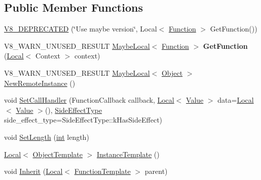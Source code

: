 \subsection*{Public Member Functions}
\begin{DoxyCompactItemize}
\item 
\mbox{\hyperlink{classv8_1_1FunctionTemplate_abd995d08f790cadf070d0fbd2af34b50}{V8\+\_\+\+D\+E\+P\+R\+E\+C\+A\+T\+ED}} (\char`\"{}Use maybe version\char`\"{}, Local$<$ \mbox{\hyperlink{classv8_1_1Function}{Function}} $>$ Get\+Function())
\item 
\mbox{\label{classv8_1_1FunctionTemplate_a9ad017f1503a6d5f89df82acbd799421}} 
V8\+\_\+\+W\+A\+R\+N\+\_\+\+U\+N\+U\+S\+E\+D\+\_\+\+R\+E\+S\+U\+LT \mbox{\hyperlink{classv8_1_1MaybeLocal}{Maybe\+Local}}$<$ \mbox{\hyperlink{classv8_1_1Function}{Function}} $>$ {\bfseries Get\+Function} (\mbox{\hyperlink{classv8_1_1Local}{Local}}$<$ Context $>$ context)
\item 
V8\+\_\+\+W\+A\+R\+N\+\_\+\+U\+N\+U\+S\+E\+D\+\_\+\+R\+E\+S\+U\+LT \mbox{\hyperlink{classv8_1_1MaybeLocal}{Maybe\+Local}}$<$ \mbox{\hyperlink{classv8_1_1Object}{Object}} $>$ \mbox{\hyperlink{classv8_1_1FunctionTemplate_ab648225a70140a7c4ebf4391bd917b21}{New\+Remote\+Instance}} ()
\item 
void \mbox{\hyperlink{classv8_1_1FunctionTemplate_ab7b6e9d60595d4cfd6e1a6b59e625830}{Set\+Call\+Handler}} (Function\+Callback callback, \mbox{\hyperlink{classv8_1_1Local}{Local}}$<$ \mbox{\hyperlink{classv8_1_1Value}{Value}} $>$ data=\mbox{\hyperlink{classv8_1_1Local}{Local}}$<$ \mbox{\hyperlink{classv8_1_1Value}{Value}} $>$(), \mbox{\hyperlink{namespacev8_a29711319c2b9fc7716d65faee2f7b9cb}{Side\+Effect\+Type}} side\+\_\+effect\+\_\+type=Side\+Effect\+Type\+::k\+Has\+Side\+Effect)
\item 
void \mbox{\hyperlink{classv8_1_1FunctionTemplate_a5faf23b28ee3480b23ce054d0f389a75}{Set\+Length}} (\mbox{\hyperlink{classint}{int}} length)
\item 
\mbox{\hyperlink{classv8_1_1Local}{Local}}$<$ \mbox{\hyperlink{classv8_1_1ObjectTemplate}{Object\+Template}} $>$ \mbox{\hyperlink{classv8_1_1FunctionTemplate_acc7ec612c5eb38e5f76f75eaf1efd776}{Instance\+Template}} ()
\item 
void \mbox{\hyperlink{classv8_1_1FunctionTemplate_abc11c462facf11bafd541892815c5425}{Inherit}} (\mbox{\hyperlink{classv8_1_1Local}{Local}}$<$ \mbox{\hyperlink{classv8_1_1FunctionTemplate}{Function\+Template}} $>$ parent)

\end{DoxyCompactItemize}
